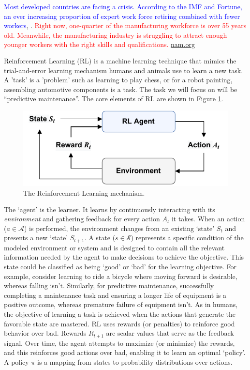 \documentclass{article}
\begin{document}
\textcolor{blue}{Most developed countries are facing a crisis. According to the IMF and Fortune, an ever increasing proportion of expert work force retiring combined with fewer workers}, \citep{Prakash2024Germanys, Fletcher2024Germanys}. \textcolor{red}{Right now, one-quarter of the manufacturing workforce is over 55 years old. Meanwhile, the manufacturing industry is struggling to attract enough younger workers with the right skills and qualifications.} \href{https://nam.org/new-report-dives-into-retaining-the-aging-manufacturing-workforce-5579/?stream=workforce}{nam.org}

Reinforcement Learning (RL) is a machine learning technique that mimics the trial-and-error learning mechanism humans and animals use to learn a new task. A 'task' is a 'problem' such as learning to play chess, or for a robot painting, assembling automotive components is a task. The task we will focus on will be ``predictive maintenance''. The core elements of RL are shown in Figure \ref{fig:RL}.
\begin{figure}[h]
	\centering
	\includegraphics[width=0.5\linewidth]{images/RL-loop.pdf}
	\caption{The Reinforcement Learning mechanism.}
	\label{fig:RL}
\end{figure}

The `agent' is the learner. It learns by continuously interacting with its \textit{environment} and gathering feedback for every action $A_t$ it takes. When an action ($a\in \mathcal{A}$) is performed, the environment changes from an existing `state' $S_t$ and presents a new `state' $S_{t+1}$. A state ($s\in \mathcal{S}$) represents a specific condition of the modeled environment or system and is designed to contain all the relevant information needed by the agent to make decisions to achieve the objective. This state could be classified as being `good' or `bad' for the learning objective. For example, consider learning to ride a bicycle where moving forward is desirable, whereas falling isn't. Similarly, for predictive maintenance, successfully completing a maintenance task and ensuring a longer life of equipment is a positive outcome, whereas premature failure of equipment isn't. As in humans, the objective of learning a task is achieved when the actions that generate the favorable state are mastered. RL uses rewards (or penalties) to reinforce good behavior over bad. Rewards $R_{t+1}$ are scalar values that serve as the feedback signal. Over time, the agent attempts to maximize (or minimize) the rewards, and this reinforces good actions over bad, enabling it to learn an optimal `policy'. A policy $\pi$ is a mapping from states to probability distributions over actions.
\end{document}
